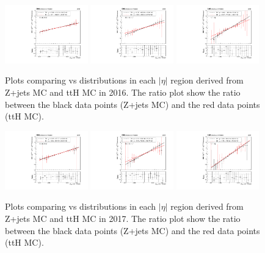 \begin{figure}[h!]
    \centering
    \includegraphics[width=0.32\textwidth]{images_geofit/ttH_eta_0_0p9_2016.pdf}
    \includegraphics[width=0.32\textwidth]{images_geofit/ttH_eta_0p9_1p7_2016.pdf}
    \includegraphics[width=0.32\textwidth]{images_geofit/ttH_eta_1p7_inf_2016.pdf}
    \caption{Plots comparing \dptoverptsquare vs \dzeroBS distributions in each $|\eta|$ region derived from Z+jets MC and ttH MC in 2016. The ratio plot show the ratio between the black data points (Z+jets MC) and the red data points (ttH MC).}
    \label{fig:ttH_d0_2016}
\end{figure}

\begin{figure}[h!]
    \centering
    \includegraphics[width=0.32\textwidth]{images_geofit/ttH_eta_0_0p9_2017.pdf}
    \includegraphics[width=0.32\textwidth]{images_geofit/ttH_eta_0p9_1p7_2017.pdf}
    \includegraphics[width=0.32\textwidth]{images_geofit/ttH_eta_1p7_inf_2017.pdf}
    \caption{Plots comparing \dptoverptsquare vs \dzeroBS distributions in each $|\eta|$ region derived from Z+jets MC and ttH MC in 2017. The ratio plot show the ratio between the black data points (Z+jets MC) and the red data points (ttH MC).}
    \label{fig:ttH_d0_2017}
\end{figure}

